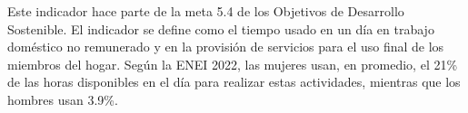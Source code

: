 Este indicador hace parte de la meta 5.4 de los Objetivos de Desarrollo Sostenible. El indicador se define como el tiempo usado en un día en trabajo doméstico no remunerado y en la provisión de servicios para el uso final de los miembros del hogar.
Según la ENEI 2022, las mujeres usan, en promedio, el 21\% de las horas disponibles en el día para realizar estas actividades, mientras que los hombres usan 3.9\%.